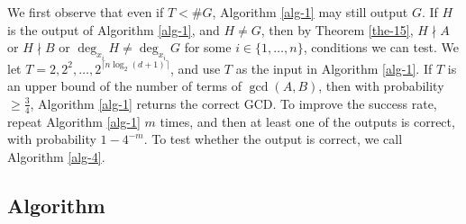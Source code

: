 \documentclass[final,20pt]{elsarticle}
\def\MoCont{\hbox{\rm{MoCont}}}
\begin{document}
We first observe that even if $T < \#G$, Algorithm \ref{alg-1} may still output $G$.
If $H$ is the output of Algorithm \ref{alg-1}, and $H\neq G$, then by Theorem \ref{the-15}, $H\nmid A$ or $H\nmid B$ or $\deg_{x_i}H \ne \deg_{x_i}G$ for some $i\in\{1,\dots,n\}$, conditions we can test.
%
%
%
%
We let $T=2,2^2,\dots,2^{\lceil n\log_2(d+1)\rceil}$, and use $T$ as the input in Algorithm \ref{alg-1}.
%
If $T$ is an upper bound of the number of terms of $\gcd(A,B)$, then with probability $\geq \frac{3}{4}$, Algorithm \ref{alg-1} returns the correct GCD.
%
To improve the success rate,  repeat Algorithm \ref{alg-1} $m$ times, and then at least one of the outputs is correct, with probability $1-4^{-m}$.
%
To test whether the output is correct, we call Algorithm \ref{alg-4}.
%

\subsection{Algorithm}

\renewcommand{\algorithmicuntil}{\textbf{end repeat}}
\end{document}

